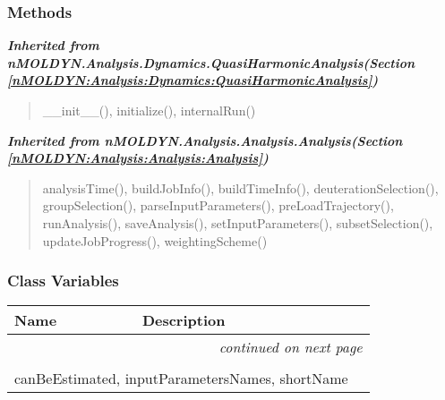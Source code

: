   \subsubsection{Methods}


\large{\textbf{\textit{Inherited from nMOLDYN.Analysis.Dynamics.QuasiHarmonicAnalysis\textit{(Section \ref{nMOLDYN:Analysis:Dynamics:QuasiHarmonicAnalysis})}}}}

\begin{quote}
\_\_init\_\_(), initialize(), internalRun()
\end{quote}

\large{\textbf{\textit{Inherited from nMOLDYN.Analysis.Analysis.Analysis\textit{(Section \ref{nMOLDYN:Analysis:Analysis:Analysis})}}}}

\begin{quote}
analysisTime(), buildJobInfo(), buildTimeInfo(), deuterationSelection(), groupSelection(), parseInputParameters(), preLoadTrajectory(), runAnalysis(), saveAnalysis(), setInputParameters(), subsetSelection(), updateJobProgress(), weightingScheme()
\end{quote}


  \subsubsection{Class Variables}

    \vspace{-1cm}
\hspace{\varindent}\begin{longtable}{|p{\varnamewidth}|p{\vardescrwidth}|l}
\cline{1-2}
\cline{1-2} \centering \textbf{Name} & \centering \textbf{Description}& \\
\cline{1-2}
\endhead\cline{1-2}\multicolumn{3}{r}{\small\textit{continued on next page}}\\\endfoot\cline{1-2}
\endlastfoot\multicolumn{2}{|l|}{\textit{Inherited from nMOLDYN.Analysis.Dynamics.QuasiHarmonicAnalysis \textit{(Section \ref{nMOLDYN:Analysis:Dynamics:QuasiHarmonicAnalysis})}}}\\
\multicolumn{2}{|p{\varwidth}|}{\raggedright canBeEstimated, inputParametersNames, shortName}\\
\cline{1-2}
\end{longtable}

